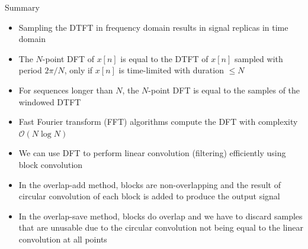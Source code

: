 \documentclass[10pt]{beamer}
\begin{document}
%
\begin{frame}{Summary}
	\begin{itemize}
		\item Sampling the DTFT in frequency domain results in signal replicas in time domain
		\item The $N$-point DFT of $x[n]$ is equal to the DTFT of $x[n]$ sampled with period $2\pi/N$, only if $x[n]$ is time-limited with duration $\leq N$
		\item For sequences longer than $N$, the $N$-point DFT is equal to the samples of the windowed DTFT
		\item Fast Fourier transform (FFT) algorithms compute the DFT with complexity $\mathcal{O}(N\log N)$
		\item We can use DFT to perform linear convolution (filtering) efficiently using block convolution
		\item In the overlap-add method, blocks are non-overlapping and the result of circular convolution of each block is added to produce the output signal
		\item In the overlap-save method, blocks do overlap and we have to discard samples that are unusable due to the circular convolution not being equal to the linear convolution at all points
	\end{itemize}
\end{frame}
\end{document}
